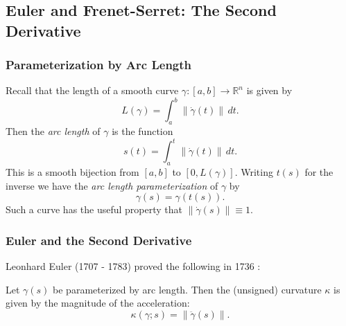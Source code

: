 \documentclass{beamer}
\newcommand{\R}{\mathbb{R}}
\newcommand{\norm}[1]{\left\lVert#1\right\rVert}
\theoremstyle{definition}
\begin{document}
\subsection{Euler and Frenet-Serret: The Second Derivative}

\begin{frame}
    \frametitle{Parameterization by Arc Length}

    Recall that the length of a smooth curve $\gamma : [a,b] \to \R^n$ is given by
    \[
        L(\gamma) = \int_a^b \norm{\dot\gamma(t)} \,dt.
    \]
    Then the \emph{arc length} of $\gamma$ is the function
    \[
        s(t) = \int_a^t \norm{\dot\gamma(t)} \,dt.
    \]
    This is a smooth bijection from $[a,b]$ to $[0,L(\gamma)]$. Writing $t(s)$ for the inverse
    we have the \emph{arc length parameterization} of $\gamma$ by
    \[
      \gamma(s) = \gamma(t(s)).
    \]
    Such a curve has the useful property that $\norm{\dot\gamma(s)} \equiv 1$.
\end{frame}

\begin{frame}
    \frametitle{Euler and the Second Derivative}

    Leonhard Euler (1707 - 1783) proved the following in 1736 \cite{geom-diff-view}:

    \begin{theorem}
        Let $\gamma(s)$ be parameterized by arc length. Then the (unsigned) curvature
        $\kappa$ is given by the magnitude of the acceleration:
        \[
          \kappa(\gamma;s) = \norm{\ddot\gamma(s)}.
        \]
    \end{theorem}
\end{frame}



\end{document}
